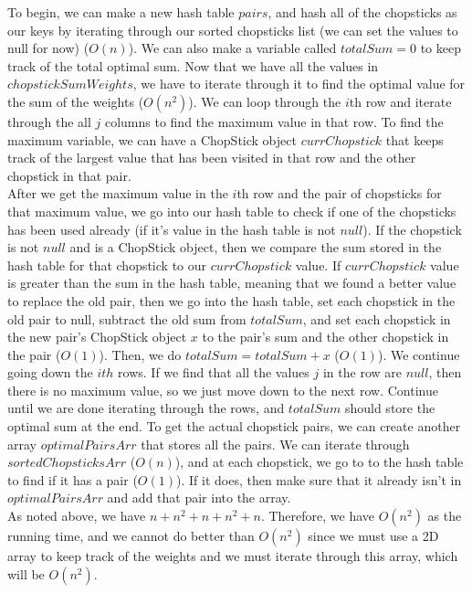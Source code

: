 \documentclass{article}
\begin{document}
\noindent To begin, we can make a new hash table $pairs$, and hash all of the chopsticks as our keys by iterating through our sorted chopsticks list (we can set the values to null for now) ($O(n)$). We can also make a variable called $totalSum=0$ to keep track of the total optimal sum. Now that we have all the values in $chopstickSumWeights$, we have to iterate through it to find the optimal value for the sum of the weights ($O(n^2)$). We can loop through the $i$th row and iterate through the all $j$ columns to find the maximum value in that row. To find the maximum variable, we can have a ChopStick object $currChopstick$ that keeps track of the largest value that has been visited in that row and the other chopstick in that pair.\\

\noindent After we get the maximum value in the $i$th row and the pair of chopsticks for that maximum value, we go into our hash table to check if one of the chopsticks has been used already (if it's value in the hash table is not $null$). If the chopstick is not $null$ and is a ChopStick object, then we compare the sum stored in the hash table for that chopstick to our $currChopstick$ value. If $currChopstick$ value is greater than the sum in the hash table, meaning that we found a better value to replace the old pair, then we go into the hash table, set each chopstick in the old pair to null, subtract the old sum from $totalSum$, and set each chopstick in the new pair's ChopStick object $x$ to the pair's sum and the other chopstick in the pair ($O(1)$). Then, we do $totalSum = totalSum + x$ ($O(1)$). We continue going down the $ith$ rows. If we find that all the values $j$ in the row are $null$, then there is no maximum value, so we just move down to the next row. Continue until we are done iterating through the rows, and $totalSum$ should store the optimal sum at the end. To get the actual chopstick pairs, we can create another array $optimalPairsArr$ that stores all the pairs. We can iterate through $sortedChopsticksArr$ ($O(n)$), and at each chopstick, we go to to the hash table to find if it has a pair ($O(1)$). If it does, then make sure that it already isn't in $optimalPairsArr$ and add that pair into the array.\\

\noindent As noted above, we have $n+n^2+n+n^2+n$. Therefore, we have $O(n^2)$ as the running time, and we cannot do better than $O(n^2)$ since we must use a 2D array to keep track of the weights and we must iterate through this array, which will be $O(n^2)$.\\
\end{document}
